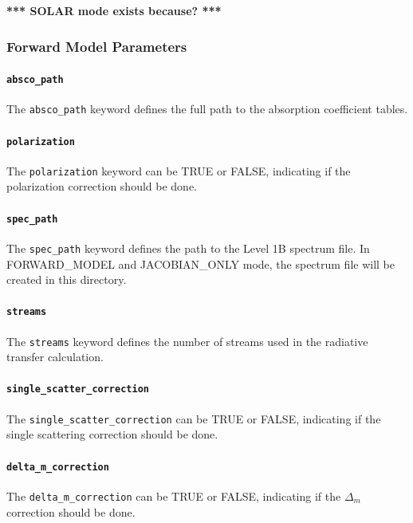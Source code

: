 \documentclass{article}
\begin{document}
\textbf{*** SOLAR mode exists because? ***}

\subsubsection{Forward Model Parameters}

\paragraph{\texttt{absco\_path}}

The \texttt{absco\_path} keyword defines the full path to the absorption
coefficient tables.

\paragraph{\texttt{polarization}}

The \texttt{polarization} keyword can be TRUE or FALSE, indicating if
the polarization correction should be done.

\paragraph{\texttt{spec\_path}}

The \texttt{spec\_path} keyword defines the path to the Level 1B
spectrum file.  In FORWARD\_MODEL and JACOBIAN\_ONLY mode, the spectrum file
will be created in this directory.  

\paragraph{\texttt{streams}}

The \texttt{streams} keyword defines the number of streams used in the
radiative transfer calculation.

\paragraph{\texttt{single\_scatter\_correction}}

The \texttt{single\_scatter\_correction} can be TRUE or FALSE, indicating if
the single scattering correction should be done.

\paragraph{\texttt{delta\_m\_correction}}

The \texttt{delta\_m\_correction} can be TRUE or FALSE, indicating if
the $\Delta_m$ correction should be done.
\end{document}
